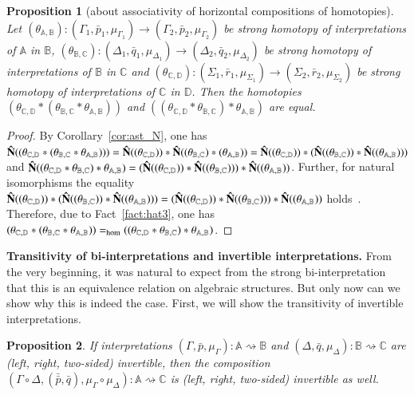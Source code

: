 \documentclass[12pt]{article}
\newtheorem{proposition}{Proposition}
\theoremstyle{definition}
\def\MA{{\mathbb{A}}}
\def\MB{{\mathbb{B}}}
\def\MC{{\mathbb{C}}}
\def\MD{{\mathbb{D}}}
\begin{document}
\begin{proposition}[about associativity of horizontal compositions of homotopies]\label{ABCD_hom}
Let $(\theta_{\MA,\MB})\colon (\Gamma_1,\bar p_1,\mu_{\Gamma_1})\to (\Gamma_2,\bar p_2,\mu_{\Gamma_2})$ be strong homotopy of interpretations of $\MA$ in $\MB$, $(\theta_{\MB,\MC})\colon (\Delta_1,\bar q_1,\mu_{\Delta_1})\to (\Delta_2,\bar q_2,\mu_{\Delta_2})$ be strong homotopy of interpretations of $\MB$ in $\MC$ and $(\theta_{\MC,\MD})\colon (\Sigma_1,\bar r_1,\mu_{\Sigma_1})\to (\Sigma_2,\bar r_2,\mu_{\Sigma_2})$ be strong homotopy of interpretations of $\MC$ in $\MD$. Then the homotopies $(\theta_{\MC,\MD}\ast(\theta_{\MB,\MC}\ast\theta_{\MA,\MB}))$ and $((\theta_{\MC,\MD}\ast\theta_{\MB,\MC})\ast\theta_{\MA,\MB})$ are equal.
\end{proposition}

\begin{proof}
By Corollary~\ref{cor:ast_N}, one has ${\bf \hat N}((\theta_{\MC,\MD}\ast(\theta_{\MB,\MC}\ast\theta_{\MA,\MB})))={\bf \hat N}((\theta_{\MC,\MD}))\ast {\bf \hat N}((\theta_{\MB,\MC})\ast(\theta_{\MA,\MB}))={\bf \hat N}((\theta_{\MC,\MD}))\ast({\bf \hat N}((\theta_{\MB,\MC}))\ast{\bf \hat N}((\theta_{\MA,\MB})))$ and ${\bf \hat N}((\theta_{\MC,\MD}\ast\theta_{\MB,\MC})\ast\theta_{\MA,\MB})=
({\bf \hat N}((\theta_{\MC,\MD}))\ast{\bf \hat N}((\theta_{\MB,\MC})))\ast{\bf \hat N}((\theta_{\MA,\MB}))$. Further, for natural isomorphisms the equality ${\bf \hat N}((\theta_{\MC,\MD}))\ast({\bf \hat N}((\theta_{\MB,\MC}))\ast{\bf \hat N}((\theta_{\MA,\MB})))=({\bf\hat  N}((\theta_{\MC,\MD}))\ast{\bf \hat N}((\theta_{\MB,\MC})))\ast{\bf \hat N}((\theta_{\MA,\MB}))$ holds~\cite{MacLane}. Therefore, due to Fact~\ref{fact:hat3}, one has $(\theta_{\MC,\MD}\ast(\theta_{\MB,\MC}\ast\theta_{\MA,\MB}))=_{\rm hom}((\theta_{\MC,\MD}\ast\theta_{\MB,\MC})\ast\theta_{\MA,\MB})$.
\end{proof}

{\bf Transitivity of bi-interpretations and invertible interpretations.} 
From the very beginning, it was natural to expect from the strong bi-interpretation that this is an equivalence relation on algebraic structures. But only now can we show why this is indeed the case. First, we will show the transitivity of invertible interpretations.

\begin{proposition}\label{prop2:par}
If interpretations $(\Gamma,\bar p,\mu_\Gamma)\colon\MA\rightsquigarrow\MB$ and $(\Delta,\bar q,\mu_\Delta)\colon\MB\rightsquigarrow\MC$ are (left, right, two-sided) invertible, then the composition $(\Gamma\circ\Delta,(\bar{\bar p},\bar q),\mu_{\Gamma}\circ\mu_{\Delta})\colon \MA\rightsquigarrow\MC$ is (left, right, two-sided) invertible as well.
\end{proposition}
\end{document}
